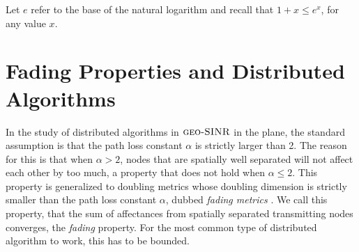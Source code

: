 \documentclass[11pt]{amsart}
\newcommand{\geomodel}{\textsc{geo-SINR}}
\newcommand{\authorcomment}[1]{}
\begin{document}
Let $e$ refer to the base of the natural logarithm and recall that $1+x \le e^x$, for any value $x$.



\section{Fading Properties and Distributed Algorithms}
\label{sec:fading}

\iffalse
\begin{quote}
\textbf{Summary of section:} Necessity of fading for the proper working of
distributed algorithms (potential interference-only signals from
far-away are one key difference in SS-models wrt.\ graphs).
We identify a new parameter, $\gamma$, the \emph{fading parameter} of
a decay space, and show that it is in particular bounded in 
a natural extension of doubling metrics.
We discuss to what extent that assumption is necessary.

Also: Want to claim that if algorithms hold in the plane, without
using geometry directly, but only the fading property, they work also
in decay spaces of bounded fading.
\end{quote}
\fi

In the study of distributed algorithms in $\geomodel$ in the plane, the
standard assumption is that the path loss constant $\alpha$ is
strictly larger than 2. The reason for this is that when $\alpha > 2$, nodes
that are spatially well separated will not affect each other by too
much, a property that does not hold when $\alpha \le 2$.
This property is generalized to doubling metrics whose doubling dimension is strictly smaller than the path loss constant $\alpha$, dubbed \emph{fading metrics} \cite{us:talg12}.
We call this property, that the sum of affectances from spatially separated transmitting nodes 
converges, the \emph{fading} property. For the most common type of distributed algorithm to work, this has to be bounded.


\iffalse One candidate approach for extending the fading property to decay
spaces would be to apply the same argument to the corresponding
quasi-distance metric.  If the result (quasi-)metric is indeed a
fading metric, everything is fine and well.  The problem is that in
the process of turning decays into quasi-distances, we may have
introduced a non-fading behavior.  For the purpose of metricity, we
want decays to be small, but for fading purposes, they need to be
sufficiently large.  \authorcomment{This is actually not true. It is indeed
  sufficient to check if the induced quasi-distance metric is a fading
  metric w.r.t\ $\zeta$. Which means we could omit the fading
  lemma.... But, it should be useful to have it argued in full
  generality directly in the decay space. }
\fi
\end{document}

